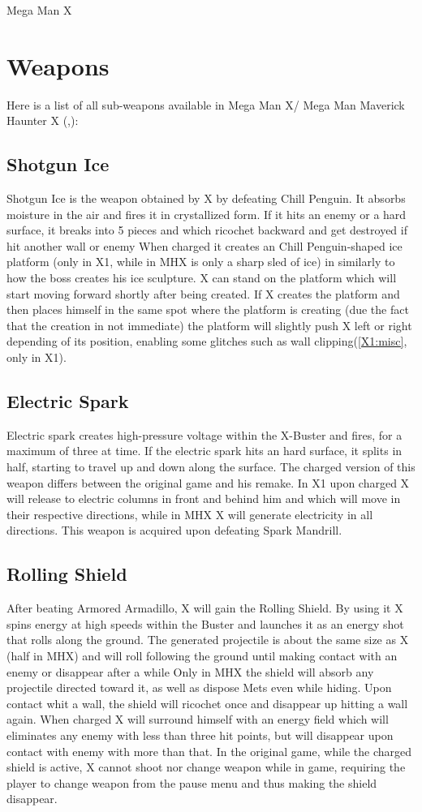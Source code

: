 \documentclass[openany]{report}
\begin{document}
\begin{chapter}{Mega Man X}
	\section{Weapons}\label{X1:sub_weapon}
	Here is a list of all sub-weapons available in Mega Man X/ Mega Man Maverick Haunter X (\cite{MHX:manual},\cite{wiki:X1_weapons}):
	\subsection{Shotgun Ice}
	Shotgun Ice is the weapon obtained by X by defeating Chill Penguin. It absorbs moisture in the air and fires it in crystallized form. If it hits an enemy or a hard surface, it breaks into 5 pieces and which ricochet backward and get destroyed if hit another wall or enemy When charged it creates an Chill Penguin-shaped ice platform (only in X1, while in MHX is only a sharp sled of ice) in similarly to how the boss creates his ice sculpture. X can stand on the platform which will start moving forward shortly after being created. If X creates the platform and then places himself in the same spot where the platform is creating (due the fact that the creation in not immediate) the platform will slightly push X left or right depending of its position, enabling some glitches such as wall clipping(\ref{X1:misc}, only in X1).
	\subsection{Electric Spark}
	Electric spark creates high-pressure voltage within the X-Buster and fires, for a maximum of three at time. If the electric spark hits an hard surface, it splits in half, starting to travel up and down along the surface. The charged version of this weapon differs between the original game and his remake. In X1 upon charged X will release to electric columns in front and behind him and which will move in their respective directions, while in MHX X will generate electricity in all directions. This weapon is acquired upon defeating Spark Mandrill.
	\subsection{Rolling Shield}
	After beating Armored Armadillo, X will gain the Rolling Shield. By using it X spins energy at high speeds within the Buster and launches it	as an energy shot that rolls along the ground. The generated projectile is about the same size as X (half in MHX) and will roll following the ground until making contact with an enemy or disappear after a while Only in MHX the shield will absorb any projectile directed toward it, as well as dispose Mets even while hiding\cite{wiki:Rolling_shield}. Upon contact whit a wall, the shield will ricochet once and disappear up hitting a wall again. When charged X will surround himself with an energy field which will eliminates any enemy with less than three hit points, but will disappear upon contact with enemy with more than that. In the original game, while the charged shield is active, X cannot shoot nor change weapon while in game, requiring the player to change weapon from the pause menu and thus making the shield disappear.

\end{chapter}
\end{document}
